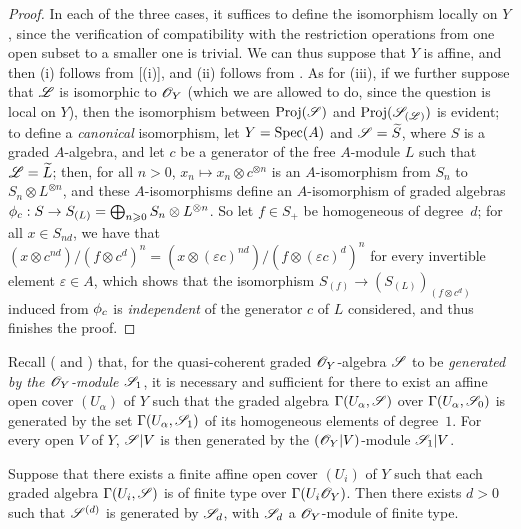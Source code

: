 \begin{proof}
In each of the three cases, it suffices to define the isomorphism locally on $Y$, since the verification of compatibility with the restriction operations from one open subset to a smaller one is trivial.
We can thus suppose that $Y$ is affine, and then (i) follows from [(i)], and (ii) follows from .
As for (iii), if we further suppose that $\mathscr{L}$ is isomorphic to $\mathscr{O}_Y$ (which we are allowed to do, since the question is local on $Y$), then the isomorphism between $\operatorname{Proj}(\mathscr{S})$ and $\operatorname{Proj}(\mathscr{S}_{(\mathscr{L})})$ is evident;
to define a \emph{canonical} isomorphism, let $Y=\operatorname{Spec}(A)$ and $\mathscr{S}=\widetilde{S}$, where $S$ is a graded $A$-algebra, and let $c$ be a generator of the free $A$-module $L$ such that $\mathscr{L}=\widetilde{L}$;
then, for all $n>0$, $x_n\mapsto x_n\otimes c^{\otimes n}$ is an $A$-isomorphism from $S_n$ to $S_n\otimes L^{\otimes n}$, and these $A$-isomorphisms define an $A$-isomorphism of graded algebras $\vphi_c:S\to S_{(L)}=\bigoplus_{n\geq0}S_n\otimes L^{\otimes n}$.
So let $f\in S_+$ be homogeneous of degree~$d$;
for all $x\in S_{nd}$, we have that $(x\otimes c^{nd})/(f\otimes c^d)^n=(x\otimes(\varepsilon c)^{nd})/(f\otimes(\varepsilon c)^d)^n$ for every invertible element $\varepsilon\in A$, which shows that the isomorphism $S_{(f)}\to(S_{(L)})_{(f\otimes c^d)}$ induced from $\phi_c$ is \emph{independent} of the generator $c$ of $L$ considered, and thus finishes the proof.
\end{proof}

\begin{env}[3.1.9]
\label{II.3.1.9}
Recall ( and ) that, for the quasi-coherent graded $\mathscr{O}_Y$-algebra $\mathscr{S}$ to be \emph{generated by the $\mathscr{O}_Y$-module $\mathscr{S}_1$}, it is necessary and sufficient for there to exist an affine open cover $(U_\alpha)$ of $Y$ such that the graded algebra $\Gamma(U_\alpha,\mathscr{S})$ over $\Gamma(U_\alpha,\mathscr{S}_0)$ is generated by the set $\Gamma(U_\alpha,\mathscr{S}_1)$ of its homogeneous elements of degree~$1$.
For every open $V$ of $Y$, $\mathscr{S}|V$ is then generated by the $(\mathscr{O}_Y|V)$-module $\mathscr{S}_1|V$.
\end{env}

\begin{proposition}[3.1.10]
\label{II.3.1.10}
Suppose that there exists a finite affine open cover $(U_i)$ of $Y$ such that each graded algebra $\Gamma(U_i,\mathscr{S})$ is of finite type over $\Gamma(U_i\mathscr{O}_Y)$.
Then there exists $d>0$ such that $\mathscr{S}^{(d)}$ is generated by $\mathscr{S}_d$, with $\mathscr{S}_d$ a $\mathscr{O}_Y$-module of finite type.
\end{proposition}

